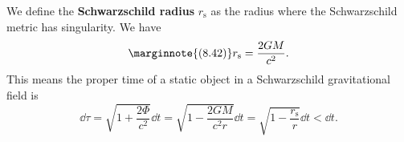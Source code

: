 \documentclass[hyperref, a4paper]{article}
\newcommand*{\concept}[1]{{\textbf{#1}}}
\begin{document}
We define the \concept{Schwarzschild radius} $r_\text{s}$ as the radius where the Schwarzschild metric 
has singularity. We have 
\begin{equation} \marginnote{(8.42)}
    r_\text{s} = \frac{2 GM}{c^2}.
\end{equation}
This means the proper time of a static object in a Schwarzschild gravitational field is 
\begin{equation}
    \dd{\tau} = \sqrt{1 + \frac{2 \Phi}{c^2}} \dd{t} = \sqrt{1 - \frac{2 G M}{c^2 r}} \dd{t} = \sqrt{1 - \frac{r_\text{s}}{r}} \dd{t} < \dd{t}.
\end{equation}



\end{document}

